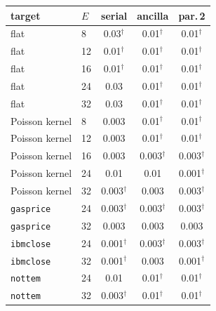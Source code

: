 \begin{tabular}{llccc}\toprule
target & $E$ & serial & ancilla & par.\,2 \\\midrule
flat & 8 & 0.03$^\dagger$ & 0.01$^\dagger$ & 0.01$^\dagger$ \\
flat & 12 & 0.01$^\dagger$ & 0.01$^\dagger$ & 0.01$^\dagger$ \\
flat & 16 & 0.01$^\dagger$ & 0.01$^\dagger$ & 0.01$^\dagger$ \\
flat & 24 & 0.03 & 0.01$^\dagger$ & 0.01$^\dagger$ \\
flat & 32 & 0.03 & 0.01$^\dagger$ & 0.01$^\dagger$ \\
Poisson kernel & 8 & 0.003 & 0.01$^\dagger$ & 0.01$^\dagger$ \\
Poisson kernel & 12 & 0.003 & 0.01$^\dagger$ & 0.01$^\dagger$ \\
Poisson kernel & 16 & 0.003 & 0.003$^\dagger$ & 0.003$^\dagger$ \\
Poisson kernel & 24 & 0.01 & 0.01 & 0.001$^\dagger$ \\
Poisson kernel & 32 & 0.003$^\dagger$ & 0.003 & 0.003$^\dagger$ \\
\texttt{gasprice} & 24 & 0.003$^\dagger$ & 0.003$^\dagger$ & 0.003$^\dagger$ \\
\texttt{gasprice} & 32 & 0.003 & 0.003 & 0.003 \\
\texttt{ibmclose} & 24 & 0.001$^\dagger$ & 0.003$^\dagger$ & 0.003$^\dagger$ \\
\texttt{ibmclose} & 32 & 0.001$^\dagger$ & 0.003 & 0.001$^\dagger$ \\
\texttt{nottem} & 24 & 0.01 & 0.01$^\dagger$ & 0.01$^\dagger$ \\
\texttt{nottem} & 32 & 0.003$^\dagger$ & 0.01$^\dagger$ & 0.01$^\dagger$ \\
\bottomrule
\end{tabular}
